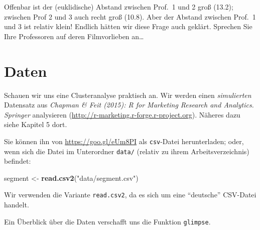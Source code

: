 \documentclass[12pt,ngerman,]{book}
\makeatletter
\newenvironment{Shaded}{\begin{snugshade}}{\end{snugshade}}
\newcommand{\KeywordTok}[1]{\textcolor[rgb]{0.13,0.29,0.53}{\textbf{{#1}}}}
\newcommand{\StringTok}[1]{\textcolor[rgb]{0.31,0.60,0.02}{{#1}}}
\newcommand{\CommentTok}[1]{\textcolor[rgb]{0.56,0.35,0.01}{\textit{{#1}}}}
\newcommand{\NormalTok}[1]{{#1}}
\newenvironment{kframe}{%
\medskip{}
\setlength{\fboxsep}{.8em}
 \def\at@end@of@kframe{}%
 \ifinner\ifhmode%
  \def\at@end@of@kframe{\end{minipage}}%
  \begin{minipage}{\columnwidth}%
 \fi\fi%
 \def\FrameCommand##1{\hskip\@totalleftmargin \hskip-\fboxsep
 \colorbox{shadecolor}{##1}\hskip-\fboxsep
     \hskip-\linewidth \hskip-\@totalleftmargin \hskip\columnwidth}%
 \MakeFramed {\advance\hsize-\width
   \@totalleftmargin\z@ \linewidth\hsize
   \@setminipage}}%
 {\par\unskip\endMakeFramed%
 \at@end@of@kframe}
\renewenvironment{Shaded}{\begin{kframe}}{\end{kframe}}
\makeatother
\begin{document}
Offenbar ist der (euklidische) Abstand zwischen Prof.~1 und 2 groß
(13.2); zwischen Prof 2 und 3 auch recht groß (10.8). Aber der Abstand
zwischen Prof.~1 und 3 ist relativ klein! Endlich hätten wir diese Frage
auch geklärt. Sprechen Sie Ihre Professoren auf deren Filmvorlieben
an\ldots{}

\section{Daten}\label{daten}

Schauen wir uns eine Clusteranalyse praktisch an. Wir werden einen
\emph{simulierten} Datensatz aus \emph{Chapman \& Feit (2015): R for
Marketing Research and Analytics. Springer} analysieren
(\url{http://r-marketing.r-forge.r-project.org}). Näheres dazu siehe
Kapitel 5 dort.

Sie können ihn von \url{https://goo.gl/eUm8PI} als \texttt{csv}-Datei
herunterladen; oder, wenn sich die Datei im Unterordner \texttt{data/}
(relativ zu ihrem Arbeitsverzeichnis) befindet:

\begin{Shaded}
\begin{Highlighting}[]
\NormalTok{segment <-}\StringTok{ }\KeywordTok{read.csv2}\NormalTok{(}\StringTok{"data/segment.csv"}\NormalTok{)}
\end{Highlighting}
\end{Shaded}

Wir verwenden die Variante \texttt{read.csv2}, da es sich um eine
``deutsche'' CSV-Datei handelt.

Ein Überblick über die Daten verschafft uns die Funktion
\texttt{glimpse}.

\begin{Shaded}
\end{Shaded}
\end{document}

